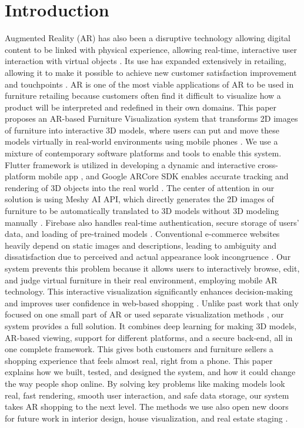 \documentclass[12pt, a4paper]{article}
\begin{document}
\section{Introduction}
Augmented Reality (AR) has also been a disruptive technology allowing digital content to be linked with physical experience, allowing real-time, interactive user interaction with virtual objects \cite{ref1}. Its use has expanded extensively in retailing, allowing it to make it possible to achieve new customer satisfaction improvement and touchpoints \cite{ref15,ref16}. AR is one of the most viable applications of AR to be used in furniture retailing because customers often find it difficult to visualize how a product will be interpreted and redefined in their own domains. This paper proposes an AR-based Furniture Visualization system that transforms 2D images of furniture into interactive 3D models, where users can put and move these models virtually in real-world environments using mobile phones \cite{ref11,ref12}. We use a mixture of contemporary software platforms and tools to enable this system. Flutter framework is utilized in developing a dynamic and interactive cross-platform mobile app \cite{ref3,ref9,ref17}, and Google ARCore SDK enables accurate tracking and rendering of 3D objects into the real world \cite{ref2,ref7}. The center of attention in our solution is using Meshy AI API, which directly generates the 2D images of furniture to be automatically translated to 3D models without 3D modeling manually \cite{ref5}. Firebase also handles real-time authentication, secure storage of users' data, and loading of pre-trained models \cite{ref4,ref18,ref19}. Conventional e-commerce websites heavily depend on static images and descriptions, leading to ambiguity and dissatisfaction due to perceived and actual appearance look incongruence \cite{ref8,ref11}. Our system prevents this problem because it allows users to interactively browse, edit, and judge virtual furniture in their real environment, employing mobile AR technology. This interactive visualization significantly enhances decision-making and improves user confidence in web-based shopping \cite{ref6,ref14}. Unlike past work that only focused on one small part of AR or used separate visualization methods \cite{ref13}, our system provides a full solution. It combines deep learning for making 3D models, AR-based viewing, support for different platforms, and a secure back-end, all in one complete framework. This gives both customers and furniture sellers a shopping experience that feels almost real, right from a phone. This paper explains how we built, tested, and designed the system, and how it could change the way people shop online. By solving key problems like making models look real, fast rendering, smooth user interaction, and safe data storage, our system takes AR shopping to the next level. The methods we use also open new doors for future work in interior design, house visualization, and real estate staging \cite{ref6,ref13,ref20}.
\end{document}
